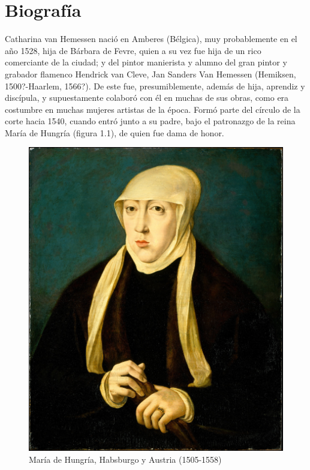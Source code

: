 \documentclass[12pt]{book}
\begin{document}
\chapter{Biografía}

Catharina van Hemessen nació en Amberes (Bélgica), muy probablemente en el año 1528, hija de Bárbara de Fevre, quien a su vez fue hija de un rico comerciante de la ciudad; y del pintor manierista y alumno del gran pintor y grabador flamenco Hendrick van Cleve, Jan Sanders Van Hemessen (Hemiksen, 1500?-Haarlem, 1566?). De este fue, presumiblemente, además de hija, aprendiz y discípula, y supuestamente colaboró con él en muchas de sus obras, como era costumbre en muchas mujeres artistas de la época. Formó parte del círculo de la corte hacia 1540, cuando entró junto a su padre, bajo el patronazgo de la reina María de Hungría (figura 1.1), de quien fue dama de honor.\bigskip

\begin{figure}
	\begin{center}
		\includegraphics[width=0.9\linewidth]{mary-queen-of-hungary}
		\caption{María de Hungría, Habsburgo y Austria (1505-1558)}
		\label{fig:wrapfig}
	\end{center}
\end{figure}
\end{document}
